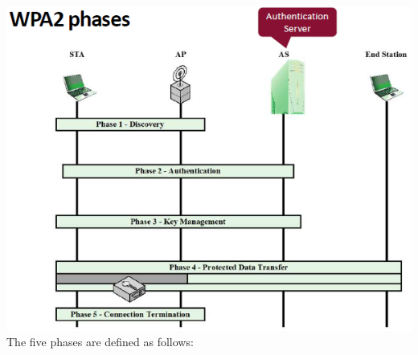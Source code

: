 \documentclass[12pt]{article}
\begin{document}
 \includegraphics[width=\linewidth]{./slides/L7P1WPA2PH.PNG}\\
 The five phases are
 defined as follows:
\end{document}
